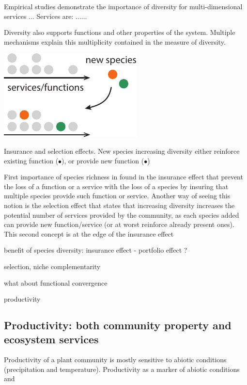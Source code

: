 Empirical studies demonstrate the importance of diversity for multi-dimensional services ... Services are: ......

Diversity also supports functions and other properties of the system. Multiple mechanisms explain this multiplicity contained in the measure of diversity. 


\begin{marginfigure}
    \includegraphics{./Figures/insurance_m.pdf}
  \caption[Diversity insurance effect]{Insurance and selection effects. New species increasing diversity either reinforce existing function (\textcolor{myOrange}{$\bullet$}), or provide new function (\textcolor{myGreen}{$\bullet$})}
  \label{fig:insurance}
\end{marginfigure}


First importance of species richness in found in the insurance effect that prevent the loss of a function or a service with the loss of a species by insuring that multiple species provide such function or service. Another way of seeing this notion is the selection effect that states that increasing diversity increases the potential number of services provided by the community, as each species added can provide new function/service (or at worst reinforce already present ones). This second concept is at the edge of the insurance effect

benefit of species diversity: insurance effect - portfolio effect ?

selection, niche complementarity

what about functional convergence

productivity 

\textbf{}

\subsection{Productivity: both community property and ecosystem services}

Productivity of a plant community is mostly sensitive to abiotic conditions (precipitation and temperature). 
Productivity as a marker of abiotic conditions and 

